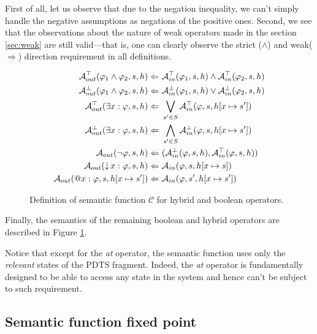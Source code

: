 First of all, let us observe that due to the negation inequality, we can't simply handle the negative assumptions as negations of the positive ones. Second, we see that the observations about the nature of weak operators made in the section \ref{sec:weak} are still valid—that is, one can clearly observe the strict ($\land$) and weak($\Rightarrow$) direction requirement in all definitions.

\begin{figure}
	\begin{align*}
	\assumeT_{out}(\varphi_1 \land \varphi_2, s, h) \Leftarrow &\ \assumeT_{in}(\varphi_1, s, h) \land \assumeT_{in}(\varphi_2, s, h) \\
	\assumeF_{out}(\varphi_1 \land \varphi_2, s, h) \Leftarrow &\ \assumeF_{in}(\varphi_1, s, h) \lor \assumeF_{in}(\varphi_2, s, h) \\
	\assumeT_{out}(\hctlExists{x} \varphi, s, h) \Leftarrow &\ \bigvee_{s' \in S} \assumeT_{in}(\varphi, s, h[x \mapsto s']) \\
	\assumeF_{out}(\hctlExists{x} \varphi, s, h) \Leftarrow &\ \bigwedge_{s' \in S} \assumeF_{in}(\varphi, s, h[x \mapsto s']) \\
	\assume_{out}(\neg \varphi, s, h) \Leftarrow &\ (\assumeF_{in}(\varphi, s, h), \assumeT_{in}(\varphi, s, h)) \\	
	\assume_{out}(\hctlBind{x} \varphi, s, h) \Leftarrow &\ \assume_{in}(\varphi, s, h[x \mapsto s]) \\
	\assume_{out}(\hctlAt{x} \varphi, s, h[x \mapsto s']) \Leftarrow &\ \assume_{in}(\varphi, s', h[x \mapsto s']) \\
	\end{align*}
	
	\caption{Definition of semantic function $\mathcal{C}$ for hybrid and boolean operators.}
	\label{fig:assHybrid}
\end{figure}

Finally, the semantics of the remaining boolean and hybrid operators are described in Figure \ref{fig:assHybrid}.

Notice that except for the \emph{at} operator, the semantic function uses only the \emph{relevant} states of the \ac{PDTS} fragment. Indeed, the \emph{at} operator is fundamentally designed to be able to access any state in the system and hence can't be subject to such requirement.

\subsection{Semantic function fixed point}

